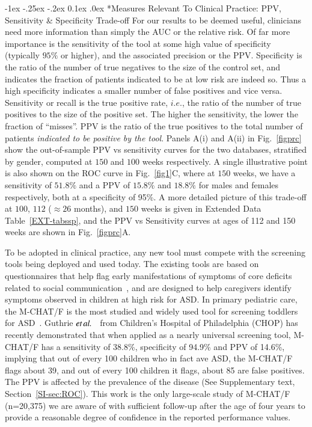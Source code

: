 \documentclass[onecolumn,,10pt]{IEEEtran}
\makeatletter
\renewcommand\subsection{\@startsection {section}{1}{\z@}%
  {-1ex \@plus -.25ex \@minus -.2ex}%
  {0.1ex \@plus.0ex}%
  {\fontsize{11}{12}\selectfont\bfseries\sffamily\color{DodgerBlue4}}}
\def\treatment{positive\xspace}
\makeatother
\begin{document}
\subsection*{Measures Relevant To Clinical Practice: PPV, Sensitivity \& Specificity Trade-off}
For our results to be deemed useful, clinicians need more information than simply the AUC or the relative risk. Of far more importance is the sensitivity of the tool at some high value of specificity (typically $95\%$ or higher), and the associated precision or the PPV. Specificity is the ratio of the number of true negatives to the size of the control set, and indicates  the fraction of patients indicated to be at low risk are indeed so. Thus a high specificity indicates a smaller number of false positives and vice versa. Sensitivity or recall is the true positive rate, $i.e.$, the ratio of the number of true positives to the size of the \treatment set. The higher the sensitivity, the lower the fraction of ``misses''. PPV is the ratio of the true positives to the total number of patients \textit{indicated to be positive by the tool}.
Panels A(i) and A(ii) in Fig.~\ref{figprc}  show  the out-of-sample  PPV vs sensitivity curves   for the two databases, stratified by gender, computed at $150$ and $100$ weeks  respectively. A single illustrative point is also shown on the ROC curve in Fig.~\ref{fig1}C, where at $150$ weeks, we have a sensitivity of $51.8\%$ and a PPV of $15.8\%$ and $18.8\%$ for males and females respectively, both at a specificity of 95\%. A more detailed picture of this trade-off  at $100$, $112$ ($\approx 26$ months), and $150$ weeks is given in Extended Data  Table~\ref{EXT-tabssp}, and the PPV vs Sensitivity curves at ages of 112 and 150 weeks  are shown in Fig.~\ref{figprc}A.

To be  adopted in clinical practice, any new tool must compete with the screening tools being deployed and used today. The existing tools  are based on questionnaires that help flag early manifestations of symptoms of core deficits related to social communication~\cite{hyman2020identification}, and are   designed to help caregivers identify  symptoms observed in children at high risk for ASD. In  primary pediatric care, the M-CHAT/F is the most studied and widely used tool
for screening toddlers for ASD~\cite{robins2014validation,hyman2020identification}.
%
Guthrie $\textit{et} \mspace{3mu} \textit{al.}$~\cite{pmid31562252} from Children's Hospital of Philadelphia (CHOP) has recently demonstrated that when applied as a nearly universal screening tool, M-CHAT/F has a sensitivity of 38.8\%, specificity of 94.9\% and PPV of 14.6\%, implying that out of every 100 children who in fact ave ASD, the M-CHAT/F flags about 39, and out of every 100 children it flags, about 85 are false positives. The PPV is affected by the prevalence of the disease (See Supplementary text, Section~\ref{SI-sec:ROC}). This work is the only large-scale study of M-CHAT/F (n=20,375) we are aware of with sufficient follow-up after the age of four years to provide a reasonable degree of confidence in the reported performance values.
\end{document}

